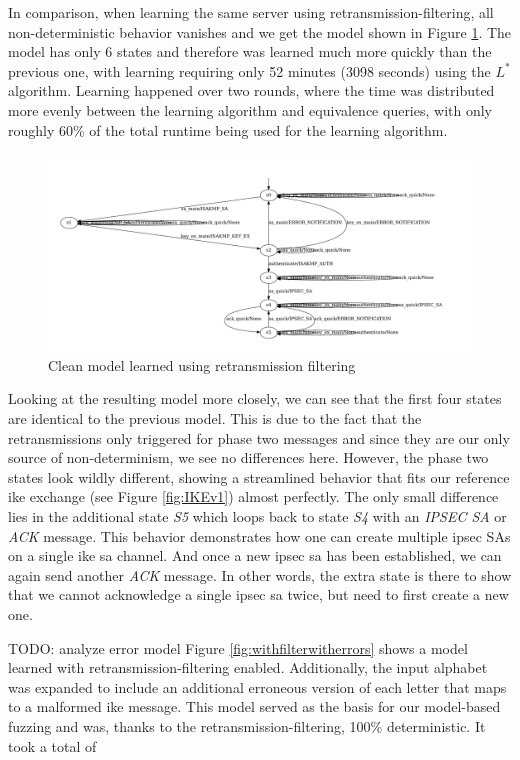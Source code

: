 In comparison, when learning the same server using retransmission-filtering, all non-deterministic behavior vanishes and we get the model shown in Figure \ref{fig:reference}. The model has only 6 states and therefore was learned much more quickly than the previous one, with learning requiring only 52 minutes (3098 seconds) using the $L^*$ algorithm. Learning happened over two rounds, where the time was distributed more evenly between the learning algorithm and equivalence queries, with only roughly 60\% of the total runtime being used for the learning algorithm. 

\begin{figure}[h]
	\centering
	\includegraphics[width=\linewidth]{images/Reference}
	\caption{Clean model learned using retransmission filtering}
	\label{fig:reference}
\end{figure} 

Looking at the resulting model more closely, we can see that the first four states are identical to the previous model. This is due to the fact that the retransmissions only triggered for phase two messages and since they are our only source of non-determinism, we see no differences here. However, the phase two states look wildly different, showing a streamlined behavior that fits our reference \ac{ike} exchange (see Figure \ref{fig:IKEv1}) almost perfectly. The only small difference lies in the additional state \emph{S5} which loops back to state \emph{S4} with an \emph{IPSEC SA} or \emph{ACK} message. This behavior demonstrates how one can create multiple \ac{ipsec} SAs on a single \ac{ike} \ac{sa} channel. And once a new \ac{ipsec} \ac{sa} has been established, we can again send another \emph{ACK} message. In other words, the extra state is there to show that we cannot acknowledge a single \ac{ipsec} \ac{sa} twice, but need to first create a new one.

TODO: analyze error model
Figure \ref{fig:withfilterwitherrors} shows a model learned with retransmission-filtering enabled. Additionally, the input alphabet was expanded to include an additional erroneous version of each letter that maps to a malformed \ac{ike} message. This model served as the basis for our model-based fuzzing and was, thanks to the retransmission-filtering, 100\% deterministic. It took a total of 

